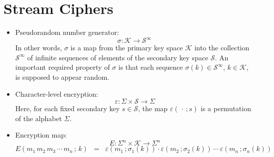 
\section{Stream Ciphers}
\setcounter{theorem}{0}
\setcounter{equation}{0}

\begin{itemize}
\item
	Pseudorandom number generator:
	\begin{equation*}
	\sigma : \mathcal{K} \longrightarrow \mathcal{S}^{\infty}\,
	\end{equation*}
	In other words, $\sigma$ is a map from the primary key space $\mathcal{K}$
	into the collection $\mathcal{S}^{\infty}$ of infinite sequences of
	elements of the secondary key space $\mathcal{S}$.
	An important required property of $\sigma$ is that each sequence
	$\sigma(k) \in \mathcal{S}^{\infty}$, $k \in \mathcal{K}$,
	is supposed to appear random.
\item
	Character-level encryption:
	\begin{equation*}
	\varepsilon : \Sigma \times \mathcal{S} \longrightarrow \Sigma
	\end{equation*}
	Here, for each fixed secondary key $s \in \mathcal{S}$,
	the map $\varepsilon(\,\cdot\,;s)$ is a permutation of
	the alphabet $\Sigma$.
\item
	Encryption map:
	\begin{equation*}
	E : \Sigma^{n} \times \mathcal{K} \longrightarrow \Sigma^{n}
	\end{equation*}
	\begin{equation*}
	E(m_{1}\,m_{2}\,m_{3} \,\cdots\, m_{n}\,;\,k) \;\; = \;\;
		\varepsilon(m_{1}\,;\sigma_{1}(k))
		\cdot
		\varepsilon(m_{2}\,;\sigma_{2}(k))
		\,\cdots\,
		\varepsilon(m_{n}\,;\sigma_{n}(k)) 
	\end{equation*}
\end{itemize}

